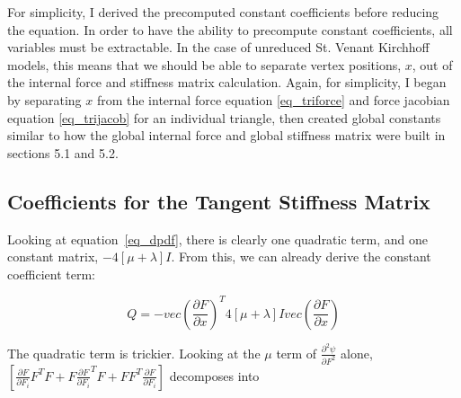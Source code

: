 \documentclass[twocolumn,10pt]{asme2ej}
\begin{document}
For simplicity, I derived the precomputed constant coefficients before reducing the equation. In order to have the ability to precompute constant coefficients, all variables must be extractable. In the case of unreduced St. Venant Kirchhoff models, this means that we should be able to separate vertex positions, $x$, out of the internal force and stiffness matrix calculation. Again, for simplicity, I began by separating $x$ from the internal force equation \ref{eq_triforce} and force jacobian equation \ref{eq_trijacob} for an individual triangle, then created global constants similar to how the global internal force and global stiffness matrix were built in sections 5.1 and 5.2.

\subsection{Coefficients for the Tangent Stiffness Matrix}

Looking at equation~\ref{eq_dpdf}, there is clearly one quadratic term, and one constant matrix, $-4[\mu + \lambda]I$. From this, we can already derive the constant coefficient term:

\begin{equation}
  Q = - vec(\frac{\partial F}{\partial x})^T 4[\mu + \lambda]I vec(\frac{\partial F}{\partial x})
  \label{eq_triconst}
\end{equation}

The quadratic term is trickier. Looking at the $\mu$ term of $\frac{\partial^2 \psi}{\partial F^2}$ alone, $[\frac{\partial F}{\partial F_i}F^TF + F\frac{\partial F}{\partial F_i}^TF + FF^T\frac{\partial F}{\partial F_i}]$ decomposes into
\end{document}
